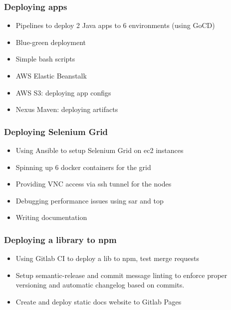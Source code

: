 \documentclass[a4paper, 14pt]{article}
\begin{document}
		\subsubsection{Deploying apps}
			\begin{itemize}
				\item Pipelines to deploy 2 Java apps to 6 environments (using GoCD) \\
				\item Blue-green deployment \\
				\item Simple bash scripts \\
				\item AWS Elastic Beanstalk \\
				\item AWS S3: deploying app configs \\
				\item Nexus Maven: deploying artifacts
			\end{itemize}

		\subsubsection{Deploying Selenium Grid}
			\begin{itemize}
				\item Using Ansible to setup Selenium Grid on ec2 instances \\
				\item Spinning up 6 docker containers for the grid \\
				\item Providing VNC access via ssh tunnel for the nodes \\
				\item Debugging performance issues using sar and top \\
				\item Writing documentation
			\end{itemize}

		\subsubsection{Deploying a library to npm}
			\begin{itemize}
				\item Using Gitlab CI to deploy a lib to npm, test merge requests \\
				\item Setup semantic-release and commit message linting to enforce proper versioning and automatic changelog based on commits. \\
				\item Create and deploy static docs website to Gitlab Pages
			\end{itemize}
\end{document}
